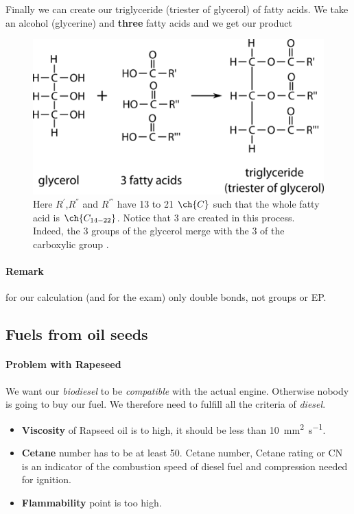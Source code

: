 \documentclass[10pt,a4paper]{article}
\begin{document}
Finally we can create our triglyceride (triester of glycerol) of fatty acids. We take an alcohol (glycerine) and {\color{red}\textbf{three}} fatty acids and we get our product

\begin{figure}[h!]
\includegraphics[scale=1]{Image/oilandfats.png}
\caption{Here $R^{'}$,$R^{''}$ and $R^{'''}$ have 13 to 21 $\ch{C}$ such that the whole fatty acid is $\ch{C_{14-22}}$. Notice that 3  are created in this process. Indeed, the 3  groups of the glycerol merge with the 3  of the carboxylic group .}
\end{figure}



\paragraph{Remark}for our calculation (and for the exam) only double bonds, not  groups or EP.

\subsection{Fuels from oil seeds}

\paragraph{Problem with Rapeseed} We want our \emph{biodiesel} to be \emph{compatible} with the actual engine. Otherwise nobody is going to buy our fuel. We therefore need to fulfill all the criteria of \emph{diesel}.

\begin{itemize}
\item \textbf{Viscosity} of Rapseed oil is to high, it should be less than \SI{10}{\square\milli\meter\per\second}. 

\item \textbf{Cetane} number has to be at least 50. Cetane number, Cetane rating or CN is an indicator of the combustion speed of diesel fuel and compression needed for ignition. 

\item \textbf{Flammability} point is too high.

\end{itemize}
\end{document}
